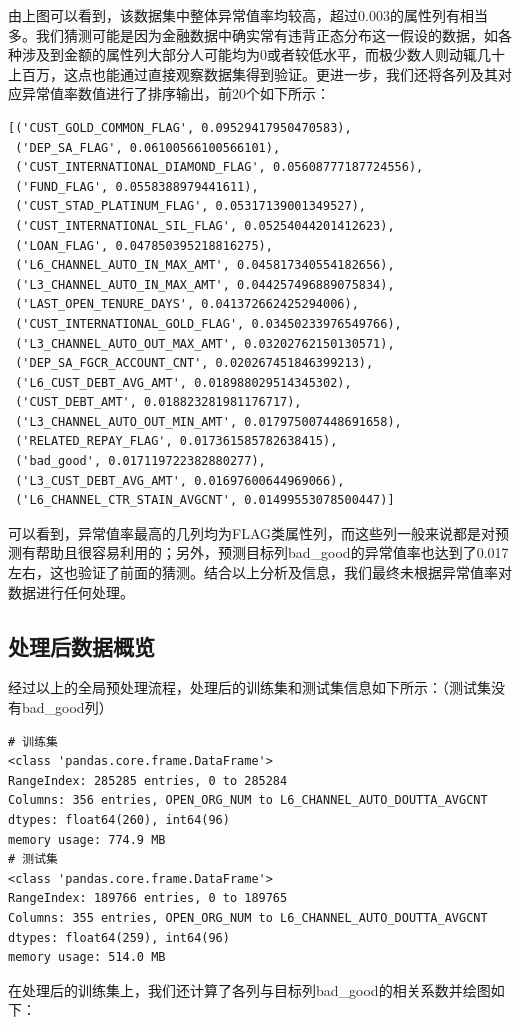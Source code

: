 \documentclass[UTF8]{article}
\begin{document}
由上图可以看到，该数据集中整体异常值率均较高，超过0.003的属性列有相当多。我们猜测可能是因为金融数据中确实常有违背正态分布这一假设的数据，如各种涉及到金额的属性列大部分人可能均为0或者较低水平，而极少数人则动辄几十上百万，这点也能通过直接观察数据集得到验证。更进一步，我们还将各列及其对应异常值率数值进行了排序输出，前20个如下所示：
\begin{lstlisting}
[('CUST_GOLD_COMMON_FLAG', 0.09529417950470583),
 ('DEP_SA_FLAG', 0.06100566100566101),
 ('CUST_INTERNATIONAL_DIAMOND_FLAG', 0.05608777187724556),
 ('FUND_FLAG', 0.0558388979441611),
 ('CUST_STAD_PLATINUM_FLAG', 0.05317139001349527),
 ('CUST_INTERNATIONAL_SIL_FLAG', 0.05254044201412623),
 ('LOAN_FLAG', 0.047850395218816275),
 ('L6_CHANNEL_AUTO_IN_MAX_AMT', 0.045817340554182656),
 ('L3_CHANNEL_AUTO_IN_MAX_AMT', 0.044257496889075834),
 ('LAST_OPEN_TENURE_DAYS', 0.041372662425294006),
 ('CUST_INTERNATIONAL_GOLD_FLAG', 0.03450233976549766),
 ('L3_CHANNEL_AUTO_OUT_MAX_AMT', 0.03202762150130571),
 ('DEP_SA_FGCR_ACCOUNT_CNT', 0.020267451846399213),
 ('L6_CUST_DEBT_AVG_AMT', 0.018988029514345302),
 ('CUST_DEBT_AMT', 0.018823281981176717),
 ('L3_CHANNEL_AUTO_OUT_MIN_AMT', 0.017975007448691658),
 ('RELATED_REPAY_FLAG', 0.017361585782638415),
 ('bad_good', 0.017119722382880277),
 ('L3_CUST_DEBT_AVG_AMT', 0.01697600644969066),
 ('L6_CHANNEL_CTR_STAIN_AVGCNT', 0.01499553078500447)]
\end{lstlisting}

可以看到，异常值率最高的几列均为FLAG类属性列，而这些列一般来说都是对预测有帮助且很容易利用的；另外，预测目标列bad\_good的异常值率也达到了0.017左右，这也验证了前面的猜测。结合以上分析及信息，我们最终未根据异常值率对数据进行任何处理。

\subsection{处理后数据概览}
经过以上的全局预处理流程，处理后的训练集和测试集信息如下所示：（测试集没有bad\_good列）
\begin{lstlisting}
# 训练集
<class 'pandas.core.frame.DataFrame'>
RangeIndex: 285285 entries, 0 to 285284
Columns: 356 entries, OPEN_ORG_NUM to L6_CHANNEL_AUTO_DOUTTA_AVGCNT
dtypes: float64(260), int64(96)
memory usage: 774.9 MB
# 测试集
<class 'pandas.core.frame.DataFrame'>
RangeIndex: 189766 entries, 0 to 189765
Columns: 355 entries, OPEN_ORG_NUM to L6_CHANNEL_AUTO_DOUTTA_AVGCNT
dtypes: float64(259), int64(96)
memory usage: 514.0 MB
\end{lstlisting}

在处理后的训练集上，我们还计算了各列与目标列bad\_good的相关系数并绘图如下：
\end{document}
